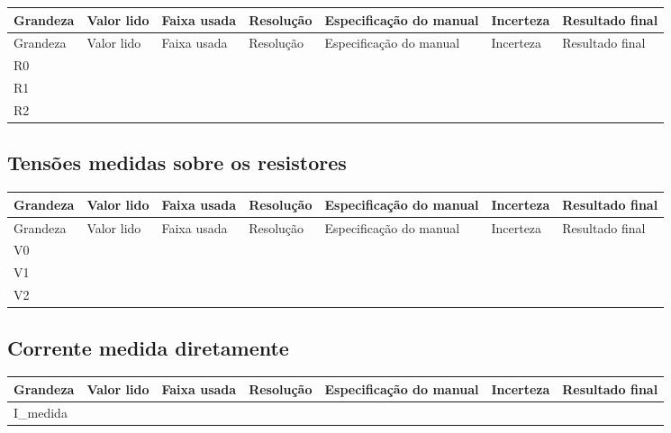 \documentclass[12pt,a4paper]{article}
\begin{document}
\small
\begin{longtable}{>{\raggedright\arraybackslash}p{1.7cm} >{\raggedright\arraybackslash}p{2cm} >{\raggedright\arraybackslash}p{1.8cm} >{\raggedright\arraybackslash}p{1.8cm} >{\raggedright\arraybackslash}p{3cm} >{\raggedright\arraybackslash}p{1.8cm} >{\raggedright\arraybackslash}p{2.3cm}}
\hline
Grandeza & Valor lido & Faixa usada & Resolução & Especificação do manual & Incerteza & Resultado final \\
\hline
\endfirsthead
\hline
Grandeza & Valor lido & Faixa usada & Resolução & Especificação do manual & Incerteza & Resultado final \\
\hline
\endhead
R0 &  &  &  &  &  &  \\
\hline
R1 &  &  &  &  &  &  \\
\hline
R2 &  &  &  &  &  &  \\
\hline
\end{longtable}
\normalsize

\subsection{Tensões medidas sobre os resistores}

\small
\begin{longtable}{>{\raggedright\arraybackslash}p{1.7cm} >{\raggedright\arraybackslash}p{2cm} >{\raggedright\arraybackslash}p{1.8cm} >{\raggedright\arraybackslash}p{1.8cm} >{\raggedright\arraybackslash}p{3cm} >{\raggedright\arraybackslash}p{1.8cm} >{\raggedright\arraybackslash}p{2.3cm}}
\hline
Grandeza & Valor lido & Faixa usada & Resolução & Especificação do manual & Incerteza & Resultado final \\
\hline
\endfirsthead
\hline
Grandeza & Valor lido & Faixa usada & Resolução & Especificação do manual & Incerteza & Resultado final \\
\hline
\endhead
V0 &  &  &  &  &  &  \\
\hline
V1 &  &  &  &  &  &  \\
\hline
V2 &  &  &  &  &  &  \\
\hline
\end{longtable}
\normalsize

\subsection{Corrente medida diretamente}

\small
\begin{tabular}{p{1.9cm} p{1.9cm} p{1.9cm} p{1.9cm} p{3.1cm} p{1.8cm} p{2.2cm}}
\hline
Grandeza & Valor lido & Faixa usada & Resolução & Especificação do manual & Incerteza & Resultado final \\
\hline
I\_medida &  &  &  &  &  &  \\
\hline
\end{tabular}
\normalsize
\end{document}
